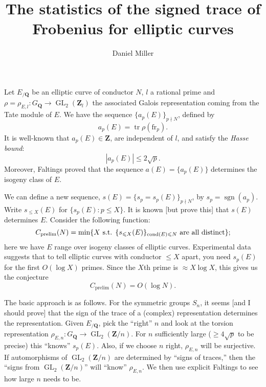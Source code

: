 \documentclass{article}
\title{The statistics of the signed trace of Frobenius for elliptic curves}
\author{Daniel Miller}
\DeclareMathOperator{\GL}{GL}
\DeclareMathOperator{\sign}{sgn}
\DeclareMathOperator{\trace}{tr}
\newcommand{\bQ}{\mathbf{Q}}
\newcommand{\bZ}{\mathbf{Z}}
\newcommand{\frob}{\mathrm{fr}}
\begin{document}
\maketitle





Let $E_{/\bQ}$ be an elliptic curve of conductor $N$, $l$ a rational prime and 
$\rho=\rho_{E,l}\colon G_\bQ\to \GL_2(\bZ_l)$ the associated Galois 
representation coming from the Tate module of $E$. We have the sequence 
$\{a_p(E)\}_{p\nmid N}$, defined by 
\[
	a_p(E) = \trace \rho(\frob_p) .
\]
It is well-known that $a_p(E)\in \bZ$, are independent of $l$, and satisfy 
the \emph{Hasse bound}:
\[
	|a_p(E)| \leqslant 2\sqrt p .
\]
Moreover, Faltings proved that the sequence $a(E) = \{a_p(E)\}$ determines the 
isogeny class of $E$. 

We can define a new sequence, $s(E) = \{s_p=s_p(E)\}_{p\nmid N}$, by 
$s_p = \sign(a_p)$. Write $s_{\leqslant X}(E)$ for 
$\{s_p(E)\colon p\leqslant X\}$. It is known [but prove this] that $s(E)$ 
determines $E$. Consider the following function: 
\[
	C_\mathrm{prelim}(N) = \min\{X\textnormal{ s.t. }\{s_{\leqslant X}(E)\}_{\mathrm{cond}(E)\leqslant N}\textnormal{ are all distinct}\} ;
\]
here we have $E$ range over isogeny classes of elliptic curves. Experimental 
data suggests that to tell elliptic curves with conductor $\leqslant X$ apart, 
you need $s_p(E)$ for the first $O(\log X)$ primes. Since the $X$th prime is 
$\approx X\log X$, this gives us the conjecture 
\[
	C_\mathrm{prelim}(N) = O(\log N) .
\]

The basic approach is as follows. For the symmetric groups $S_n$, it seems 
[and I should prove] that the sign of the trace of a (complex) representation 
determines the representation. Given $E_{/\bQ}$, pick the ``right'' $n$ and 
look at the torsion representation $\rho_{E,n}\colon G_\bQ\to \GL_2(\bZ/n)$. 
For $n$ sufficiently large ($\geqslant 4\sqrt p$ to be precise) this ``knows'' 
$s_p(E)$. Also, if we choose $n$ right, $\rho_{E,n}$ will be surjective. If 
automorphisms of $\GL_2(\bZ/n)$ are determined by ``signs of traces,'' then 
the ``signs from $\GL_2(\bZ/n)$'' will ``know'' $\rho_{E,n}$. We then use 
explicit Faltings to see how large $n$ needs to be. 
\end{document}
